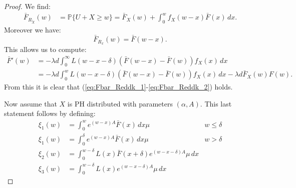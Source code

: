 \documentclass[12pt]{report}
\renewcommand{\P}{\mathbb{P}}
\renewcommand{\P}{\mathbb{P}}
\begin{document}
\begin{proof}
	We find: 
	\begin{align*}
		\bar F_{R_{\tilde{X}}}(w)
		&= \P \{U + X \geq w\} = \bar F_X(w) + \int_0^w f_X(w-x) \bar F(x) \, dx.
	\end{align*}
	Moreover we have:
	$$
	\bar F_{R_x}(w) = \bar F(w-x).
	$$
	This allows us to compute:
	\begin{align*}
		\bar F'(w)
		&=
		-\lambda d \int_0^{\infty}  L(w-x-\delta) \left(\bar F(w-x) - \bar F(w) \right) f_X(x)\, dx\\
		&=
		-\lambda d \int_0^w L(w-x-\delta) (\bar F(w-x) - \bar F(w) ) f_X(x) \, dx 	-\lambda d \bar F_X(w) F(w).
	\end{align*}
	From this it is clear that (\ref{eq:Fbar_Reddk_1}-\ref{eq:Fbar_Reddk_2}) holds.
	
	Now assume that $X$ is PH distributed with parameters $(\alpha, A)$. This last statement follows by defining:
	\begin{align*}
		\xi_1(w)
		&= \int_0^w e^{(w-x)A} \bar F(x) \, dx \mu & w \leq \delta\\
		\xi_1(w)
		&= \int_0^\delta e^{(w-x) A} \bar F(x) \, dx \mu & w > \delta\\
		\xi_2(w) &= \int_0^{w-\delta}L(x) \bar F(x+\delta) e^{(w-x-\delta) A} \mu \, dx\\
		\xi_3(w) &= \int_0^{w-\delta}L(x) e^{(w-x-\delta)A} \mu \, dx
	\end{align*}
\end{proof}
\end{document}
